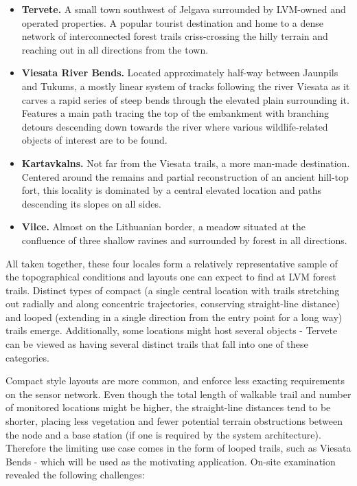 \documentclass[10pt,nocopyrightspace]{ewsn-proc}
\begin{document}
\begin{itemize}
\item \textbf{Tervete.} A small town southwest of Jelgava surrounded by LVM-owned and operated properties. A popular tourist destination and home to a dense network of interconnected forest trails criss-crossing the hilly terrain and reaching out in all directions from the town.
\item \textbf{Viesata River Bends.} Located approximately half-way between Jaunpils and Tukums, a mostly linear system of tracks following the river Viesata as it carves a rapid series of steep bends through the elevated plain surrounding it. Features a main path tracing the top of the embankment with branching detours descending down towards the river where various wildlife-related objects of interest are to be found.
\item \textbf{Kartavkalns.} Not far from the Viesata trails, a more man-made destination. Centered around the remains and partial reconstruction of an ancient hill-top fort, this locality is dominated by a central elevated location and paths descending its slopes on all sides.
\item \textbf{Vilce.} Almost on the Lithuanian border, a meadow situated at the confluence of three shallow ravines and surrounded by forest in all directions.
\end{itemize}

All taken together, these four locales form a relatively representative sample of the topographical conditions and layouts one can expect to find at LVM forest trails. Distinct types of compact (a single central location with trails stretching out radially and along concentric trajectories, conserving straight-line distance) and looped (extending in a single direction from the entry point for a long way) trails emerge. Additionally, some locations might host several objects - Tervete can be viewed as having several distinct trails that fall into one of these categories. 

Compact style layouts are more common, and enforce less exacting requirements on the sensor network. Even though the total length of walkable trail and number of monitored locations might be higher, the straight-line distances tend to be shorter, placing less vegetation and fewer potential terrain obstructions between the node and a base station (if one is required by the system architecture). Therefore the limiting use case comes in the form of looped trails, such as Viesata Bends - which will be used as the motivating application. On-site examination revealed the following challenges:
\end{document}
